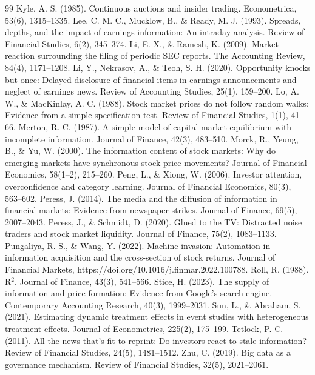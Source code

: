 \documentclass[a4paper,11pt]{ctexart}
\begin{document}
\begin{thebibliography}{99}
 Kyle, A. S. (1985). Continuous auctions and insider trading. Econometrica, 53(6), 1315–1335.
 Lee, C. M. C., Mucklow, B., \& Ready, M. J. (1993). Spreads, depths, and the impact of earnings information: An intraday analysis. Review of Financial Studies, 6(2), 345–374.
 Li, E. X., \& Ramesh, K. (2009). Market reaction surrounding the filing of periodic SEC reports. The Accounting Review, 84(4), 1171–1208.
 Li, Y., Nekrasov, A., \& Teoh, S. H. (2020). Opportunity knocks but once: Delayed disclosure of financial items in earnings announcements and neglect of earnings news. Review of Accounting Studies, 25(1), 159–200.
 Lo, A. W., \& MacKinlay, A. C. (1988). Stock market prices do not follow random walks: Evidence from a simple specification test. Review of Financial Studies, 1(1), 41–66.
 Merton, R. C. (1987). A simple model of capital market equilibrium with incomplete information. Journal of Finance, 42(3), 483–510.
 Morck, R., Yeung, B., \& Yu, W. (2000). The information content of stock markets: Why do emerging markets have synchronous stock price movements? Journal of Financial Economics, 58(1–2), 215–260.
 Peng, L., \& Xiong, W. (2006). Investor attention, overconfidence and category learning. Journal of Financial Economics, 80(3), 563–602.
 Peress, J. (2014). The media and the diffusion of information in financial markets: Evidence from newspaper strikes. Journal of Finance, 69(5), 2007–2043.
 Peress, J., \& Schmidt, D. (2020). Glued to the TV: Distracted noise traders and stock market liquidity. Journal of Finance, 75(2), 1083–1133.
 Pungaliya, R. S., \& Wang, Y. (2022). Machine invasion: Automation in information acquisition and the cross-section of stock returns. Journal of Financial Markets, https://doi.org/10.1016/j.finmar.2022.100788.
 Roll, R. (1988). R$^2$. Journal of Finance, 43(3), 541–566.
 Stice, H. (2023). The supply of information and price formation: Evidence from Google's search engine. Contemporary Accounting Research, 40(3), 1999–2031.
 Sun, L., \& Abraham, S. (2021). Estimating dynamic treatment effects in event studies with heterogeneous treatment effects. Journal of Econometrics, 225(2), 175–199.
 Tetlock, P. C. (2011). All the news that's fit to reprint: Do investors react to stale information? Review of Financial Studies, 24(5), 1481–1512.
 Zhu, C. (2019). Big data as a governance mechanism. Review of Financial Studies, 32(5), 2021–2061.
\end{thebibliography}
\end{document}
